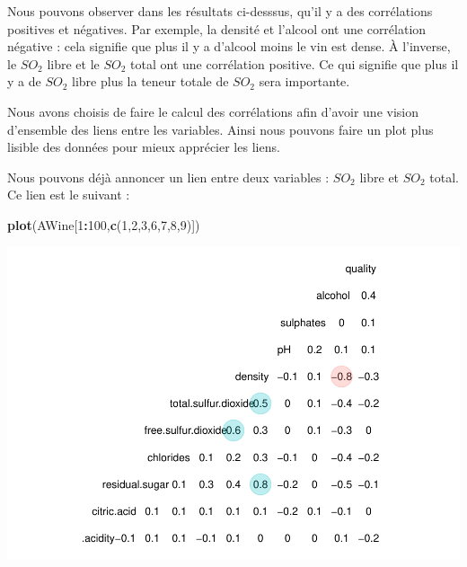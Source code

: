\documentclass[]{article}
\newenvironment{Shaded}{\begin{snugshade}}{\end{snugshade}}
\newcommand{\ControlFlowTok}[1]{\textcolor[rgb]{0.13,0.29,0.53}{\textbf{#1}}}
\newcommand{\DecValTok}[1]{\textcolor[rgb]{0.00,0.00,0.81}{#1}}
\newcommand{\KeywordTok}[1]{\textcolor[rgb]{0.13,0.29,0.53}{\textbf{#1}}}
\newcommand{\NormalTok}[1]{#1}
\newcommand{\OperatorTok}[1]{\textcolor[rgb]{0.81,0.36,0.00}{\textbf{#1}}}
\newcommand{\OtherTok}[1]{\textcolor[rgb]{0.56,0.35,0.01}{#1}}
\newcommand{\StringTok}[1]{\textcolor[rgb]{0.31,0.60,0.02}{#1}}
\begin{document}
Nous pouvons observer dans les résultats ci-desssus, qu'il y a des
corrélations positives et négatives. Par exemple, la densité et l'alcool
ont une corrélation négative : cela signifie que plus il y a d'alcool
moins le vin est dense. À l'inverse, le \(SO_2\) libre et le \(SO_2\)
total ont une corrélation positive. Ce qui signifie que plus il y a de
\(SO_2\) libre plus la teneur totale de \(SO_2\) sera importante.

Nous avons choisis de faire le calcul des corrélations afin d'avoir une
vision d'ensemble des liens entre les variables. Ainsi nous pouvons
faire un plot plus lisible des données pour mieux apprécier les liens.

Nous pouvons déjà annoncer un lien entre deux variables : \(SO_2\) libre
et \(SO_2\) total. Ce lien est le suivant :

\begin{Shaded}
\begin{Highlighting}[]
\KeywordTok{plot}\NormalTok{(AWine[}\DecValTok{1}\OperatorTok{:}\DecValTok{100}\NormalTok{,}\KeywordTok{c}\NormalTok{(}\DecValTok{1}\NormalTok{,}\DecValTok{2}\NormalTok{,}\DecValTok{3}\NormalTok{,}\DecValTok{6}\NormalTok{,}\DecValTok{7}\NormalTok{,}\DecValTok{8}\NormalTok{,}\DecValTok{9}\NormalTok{)])}
\end{Highlighting}
\end{Shaded}

\includegraphics{repport_files/figure-latex/unnamed-chunk-3-1.pdf}

\begin{Shaded}
\end{Shaded}
\end{document}
